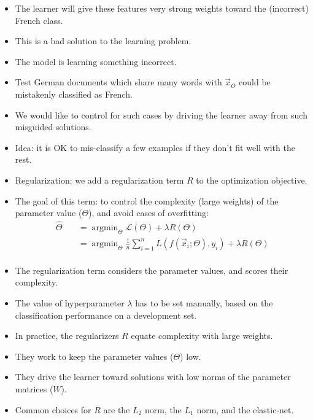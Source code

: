 \begin{itemize}
 \item The learner will give these features very strong weights toward the (incorrect) French class. 
  \item This is a bad solution to the learning problem.
 \item The model is learning something incorrect.
 \item Test German documents which share many words with $\vec{x}_O$ could be mistakenly classified as French. 
 \item We would like to control for such cases by driving the learner away from such misguided solutions.
 \item Idea: it is OK to mis-classify a few examples if they don't fit well with the rest.
  \item Regularization: we add a regularization term $R$ to the optimization objective.
  \item  The goal of this term: to control the complexity (large weights) of the parameter value ($\Theta$), and avoid cases of overfitting:
\begin{equation}
 \begin{split}
  \hat{\Theta} \quad & =  \operatorname{argmin}_{\Theta} \mathcal{L}(\Theta) + \lambda R(\Theta) \\
     \quad & =  \operatorname{argmin}_{\Theta} \frac{1}{n} \sum_{i=1}^n L(f(\vec{x}_i;\Theta), y_i) + \lambda R(\Theta) \\
 \end{split}
\end{equation}  
\item The regularization term considers the parameter values, and scores their complexity.  
\item The value of hyperparameter $\lambda$ has to be set manually, based on the classification performance on a development set.   
  \item  In practice, the regularizers $R$ equate complexity with large weights.
  \item They work to keep the parameter values ($\Theta$) low.
  \item They drive the learner toward solutions with low norms of the parameter matrices ($W$).
  \item Common choices for $R$ are the $L_2$ norm, the $L_1$ norm, and the elastic-net.
\end{itemize}

